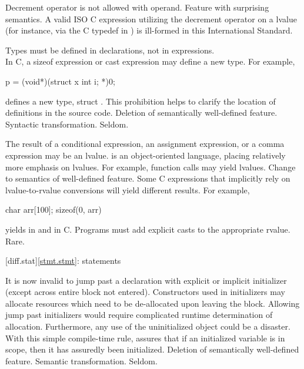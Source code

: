 \change
Decrement operator is not allowed with  operand.
\rationale
Feature with surprising semantics.
\effect
A valid ISO C expression utilizing the decrement operator on
a  lvalue
(for instance, via the C typedef in )
is ill-formed in this International Standard.

\change
Types must be defined in declarations, not in expressions.\\
In C, a sizeof expression or cast expression may define a new type.
For example,
\begin{codeblock}
p = (void*)(struct x {int i;} *)0;
\end{codeblock}
defines a new type, struct .
\rationale
This prohibition helps to clarify the location of
definitions in the source code.
\effect
Deletion of semantically well-defined feature.
\difficulty
Syntactic transformation.
\howwide
Seldom.

%
%
%
\change
The result of a conditional expression, an assignment expression, or a comma expression may be an lvalue.
\rationale
\Cpp{} is an object-oriented language, placing relatively
more emphasis on lvalues.  For example, function calls may
yield lvalues.
\effect
Change to semantics of well-defined feature.  Some C
expressions that implicitly rely on lvalue-to-rvalue
conversions will yield different results.  For example,

\begin{codeblock}
char arr[100];
sizeof(0, arr)
\end{codeblock}

yields
in \Cpp{} and
in C.
\difficulty
Programs must add explicit casts to the appropriate rvalue.
\howwide
Rare.

[diff.stat]{\ref{stmt.stmt}: statements}

\change
It is now invalid to jump past a declaration with explicit or implicit initializer (except across entire block not entered).
\rationale
Constructors used in initializers may allocate
resources which need to be de-allocated upon leaving the
block.
Allowing jump past initializers would require
complicated runtime determination of allocation.
Furthermore, any use of the uninitialized object could be a
disaster.
With this simple compile-time rule, \Cpp{} assures that
if an initialized variable is in scope, then it has assuredly been
initialized.
\effect
Deletion of semantically well-defined feature.
\difficulty
Semantic transformation.
\howwide
Seldom.

